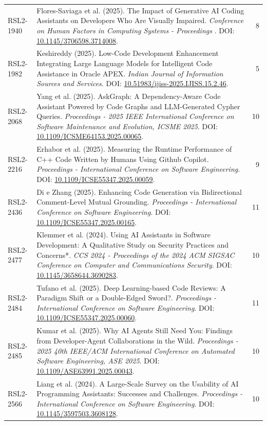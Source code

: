 \begin{small}
\begin{longtable}{lp{11.2cm}r}
RSL2-1940 & Flores-Saviaga et al. (2025). The Impact of Generative AI Coding Assistants on Developers Who Are Visually Impaired. \textit{Conference on Human Factors in Computing Systems - Proceedings }. DOI: \url{10.1145/3706598.3714008}. & 8 \\
RSL2-1982 & Keshireddy (2025). Low-Code Development Enhancement Integrating Large Language Models for Intelligent Code Assistance in Oracle APEX. \textit{Indian Journal of Information Sources and Services}. DOI: \url{10.51983/ijiss-2025.IJISS.15.2.46}. & 5 \\
RSL2-2068 & Yang et al. (2025). AskGraph: A Dependency-Aware Code Assistant Powered by Code Graphs and LLM-Generated Cypher Queries. \textit{Proceedings - 2025 IEEE International Conference on Software Maintenance and Evolution, ICSME 2025}. DOI: \url{10.1109/ICSME64153.2025.00065}. & 10 \\
RSL2-2216 & Erhabor et al. (2025). Measuring the Runtime Performance of C++ Code Written by Humans Using Github Copilot. \textit{Proceedings - International Conference on Software Engineering}. DOI: \url{10.1109/ICSE55347.2025.00059}. & 9 \\
RSL2-2436 & Di e Zhang (2025). Enhancing Code Generation via Bidirectional Comment-Level Mutual Grounding. \textit{Proceedings - International Conference on Software Engineering}. DOI: \url{10.1109/ICSE55347.2025.00165}. & 11 \\
RSL2-2477 & Klemmer et al. (2024). Using AI Assistants in Software Development: A Qualitative Study on Security Practices and Concerns*. \textit{CCS 2024 - Proceedings of the 2024 ACM SIGSAC Conference on Computer and Communications Security}. DOI: \url{10.1145/3658644.3690283}. & 10 \\
RSL2-2484 & Tufano et al. (2025). Deep Learning-based Code Reviews: A Paradigm Shift or a Double-Edged Sword?. \textit{Proceedings - International Conference on Software Engineering}. DOI: \url{10.1109/ICSE55347.2025.00060}. & 11 \\
RSL2-2485 & Kumar et al. (2025). Why AI Agents Still Need You: Findings from Developer-Agent Collaborations in the Wild. \textit{Proceedings - 2025 40th IEEE/ACM International Conference on Automated Software Engineering, ASE 2025}. DOI: \url{10.1109/ASE63991.2025.00043}. & 10 \\
RSL2-2566 & Liang et al. (2024). A Large-Scale Survey on the Usability of AI Programming Assistants: Successes and Challenges. \textit{Proceedings - International Conference on Software Engineering}. DOI: \url{10.1145/3597503.3608128}. & 10 \\

\end{longtable}
\end{small}
